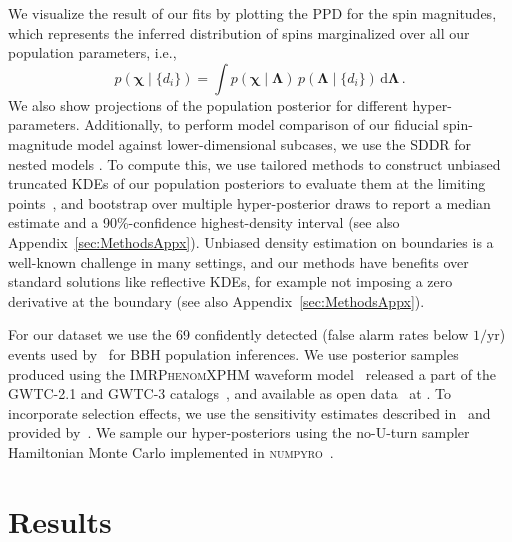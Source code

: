 \documentclass[twocolumn,usenames,dvipsnames,linenumbers]{aastex631}
\begin{document}
We visualize the result of our fits by plotting the \ac{PPD} for the spin magnitudes, which represents the inferred distribution of spins marginalized over all our population parameters, i.e.,
\begin{equation}
	p(\bm{\chi} \mid \{d_i\}) = \int p(\bm{\chi} \mid \boldsymbol{\Lambda})\, p(\boldsymbol{\Lambda} \mid \{d_i\}) \, \mathrm{d}\boldsymbol{\Lambda}\, .
	\label{eq:PPD}
\end{equation}
We also show projections of the population posterior for different hyper-parameters.
Additionally, to perform model comparison of our fiducial spin-magnitude model against lower-dimensional subcases, we use the \ac{SDDR} for nested models \citep{dickey1971weighted}.
To compute this, we use tailored methods to construct unbiased truncated \acp{KDE} of our population posteriors to evaluate them at the limiting points~\citep{TGMM_Methods},
and bootstrap over multiple hyper-posterior draws to report a median estimate and a 90\%-confidence highest-density interval (see also Appendix~\ref{sec:MethodsAppx}).
Unbiased density estimation on boundaries is a well-known challenge in many settings, and our methods have benefits over standard solutions like reflective \acp{KDE}, for example not imposing a zero derivative at the boundary (see also Appendix~\ref{sec:MethodsAppx}).

For our dataset we use the 69 confidently detected (false alarm rates below $1/\mathrm{yr}$) events used by~\cite{KAGRA:2021duu} for \ac{BBH} population inferences.
We use posterior samples produced using the \textsc{IMRPhenomXPHM} waveform model~\citep{Pratten:2020ceb} released a part of the GWTC-2.1 and GWTC-3 catalogs~\citep{LIGOScientific:2021usb,KAGRA:2021vkt}, and available as open data~\citep{LIGOScientific:2019lzm,KAGRA:2023pio} at \cite{GWOSC}. 
To incorporate selection effects, we use the sensitivity estimates described in~\cite{KAGRA:2021duu} and provided by~\cite{ligo_scientific_collaboration_and_virgo_2021_5636816}.
We sample our hyper-posteriors using the no-U-turn sampler \citep{2011arXiv1111.4246H} Hamiltonian Monte Carlo \citep{2011hmcm.book..113N,2017arXiv170102434B} implemented in \textsc{numpyro}~\citep{phan2019composable,bingham2019pyro}.


\section{Results}
\label{sec:Results}
\end{document}
